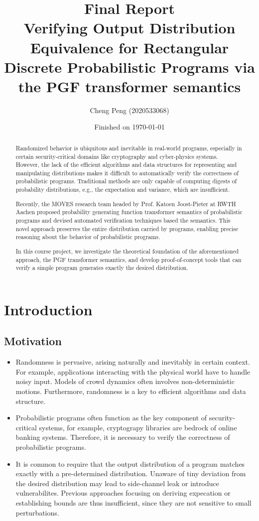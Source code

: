 \documentclass[a4paper]{article}
\title{Final Report\\
	\small Verifying Output Distribution Equivalence for Rectangular Discrete Probabilistic Programs via the PGF transformer semantics
}
\date{Finished on \today}
\author{Cheng Peng (2020533068)}
\begin{document}
\maketitle

\begin{abstract}
	Randomized behavior is ubiquitous and inevitable in real-world programs, especially in certain security-critical domains like cryptography and cyber-physics systems.
	However, the lack of the efficient algorithms and data structures for representing and manipulating distributions makes it difficult to automatically verify the correctness of probabilistic programs.
	Traditional methods are only capable of computing digests of probability distributions, e.g., the expectation and variance, which are insufficient.\par
	Recently, the MOVES research team headed by Prof. Katoen Joost-Pieter at RWTH Aachen proposed probability generating function transformer semantics of probabilistic programs and devised automated verification techniques based the semantics.
	This novel approach preserves the entire distribution carried by programs, enabling precise reasoning about the behavior of probabilistic programs.\par
	In this course project, we investigate the theoretical foundation of the aforementioned approach, the PGF transformer semantics, and develop proof-of-concept tools that can verify a simple program generates exactly the desired distribution.
\end{abstract}

\section{Introduction}

\subsection{Motivation}

\begin{itemize}
	\item Randomness is pervasive, arising naturally and inevitably in certain context.
	      For example, applications interacting with the physical world have to handle noisy input.
	      Models of crowd dynamics often involves non-deterministic motions.
	      Furthermore, randomness is a key to efficient algorithms and data structure.
	\item Probabilistic programs often function as the key component of security-critical systems,
	      for example, cryptograpy libraries are bedrock of online banking systems.
	      Therefore, it is necessary to verify the correctness of probabilistic programs.
	\item It is common to require that the output distribution of a program matches exactly with a pre-determined distribution.
	      Unaware of tiny deviation from the desired distribution may lead to side-channel leak or introduce vulnerabilites.
	      Previous approaches focusing on deriving expecation or establishing bounds are thus insufficient,
	      since they are not sensitive to small perturbations.
\end{itemize}
\end{document}
